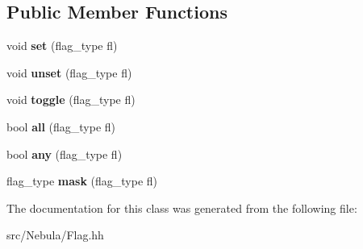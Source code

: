 \subsection*{Public Member Functions}
\begin{DoxyCompactItemize}
\item 
\hypertarget{classgal_1_1flag_a7d3d5509b05678517670ab344d5da626}{void {\bfseries set} (flag\-\_\-type fl)}\label{classgal_1_1flag_a7d3d5509b05678517670ab344d5da626}

\item 
\hypertarget{classgal_1_1flag_a367bae4fc3adab807aa7e6df1b20b517}{void {\bfseries unset} (flag\-\_\-type fl)}\label{classgal_1_1flag_a367bae4fc3adab807aa7e6df1b20b517}

\item 
\hypertarget{classgal_1_1flag_a8bffab2a607799d0c944f2caf594ee19}{void {\bfseries toggle} (flag\-\_\-type fl)}\label{classgal_1_1flag_a8bffab2a607799d0c944f2caf594ee19}

\item 
\hypertarget{classgal_1_1flag_a35c2d1efbc26977cc4f949ee447064ca}{bool {\bfseries all} (flag\-\_\-type fl)}\label{classgal_1_1flag_a35c2d1efbc26977cc4f949ee447064ca}

\item 
\hypertarget{classgal_1_1flag_af474ea5b722c2d853d4182e4b30b388f}{bool {\bfseries any} (flag\-\_\-type fl)}\label{classgal_1_1flag_af474ea5b722c2d853d4182e4b30b388f}

\item 
\hypertarget{classgal_1_1flag_ae7783c09ba627e5c78cb89b7b45e86d4}{flag\-\_\-type {\bfseries mask} (flag\-\_\-type fl)}\label{classgal_1_1flag_ae7783c09ba627e5c78cb89b7b45e86d4}

\end{DoxyCompactItemize}


The documentation for this class was generated from the following file\-:\begin{DoxyCompactItemize}
\item 
src/\-Nebula/Flag.\-hh\end{DoxyCompactItemize}
